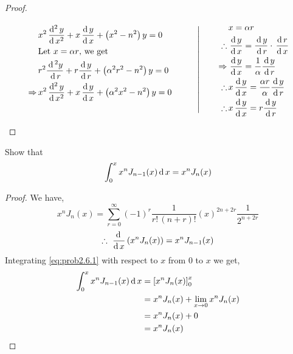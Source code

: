 \documentclass[../main-sheet.tex]{subfiles}
\begin{document}
\begin{proof}
\begin{note}
        \[
            \left.
            \begin{aligned}
                &  x^2\,\frac{\mathrm{d}^{2}\, y}{\mathrm{d}\, x^{2}}+x\,\frac{\mathrm{d}\,y}{\mathrm{d}\,x}+\left( x^2-n^2 \right)y=0\\
                &\text{Let $ x=\alpha r $, we get}\\
                &  r^2\frac{\,\mathrm{d}\,^2 y}{\,\mathrm{d}\, r}+r\frac{\,\mathrm{d}\, y}{\,\mathrm{d}\, r}+\left( \alpha^2 r^2-n^2 \right)y=0\\
                \Rightarrow\,& x^2\,\frac{\mathrm{d}^{2}\, y}{\mathrm{d}\, x^{2}}+x\,\frac{\mathrm{d}\,y}{\mathrm{d}\,x}+\left( \alpha^2 x^2-n^2 \right)y=0
                &\\
                &\\
            \end{aligned}
            \qquad\right\vert\qquad
            \begin{aligned}
                & x=\alpha r\\
                \therefore\, & \,\frac{\mathrm{d}\,y}{\mathrm{d}\,x}=\frac{\,\mathrm{d}\, y}{\,\mathrm{d}\, r}\cdot\,\frac{\mathrm{d}\,r}{\mathrm{d}\,x}\\
                \Rightarrow\, & \,\frac{\mathrm{d}\,y}{\mathrm{d}\,x}=\frac{1}{\alpha}\frac{\,\mathrm{d}\, y}{\,\mathrm{d}\, r}\\
                \therefore\, & x\,\frac{\mathrm{d}\,y}{\mathrm{d}\,x}=\frac{\alpha r}{\alpha}\frac{\,\mathrm{d}\, y}{\,\mathrm{d}\, r}\\
                \therefore\, & x\,\frac{\mathrm{d}\,y}{\mathrm{d}\,x}=r\frac{\,\mathrm{d}\, y}{\,\mathrm{d}\, r}
            \end{aligned}
        \]
    \end{note}
\end{proof}
\begin{prob}
    Show that 
    \[
        \int_0^x x^nJ_{n-1}(x)\,\mathrm{d}\, x=x^nJ_n(x)
    \]
\end{prob}
\begin{proof}
    We have,
    \[
        x^nJ_n(x)=\sum_{r=0}^\infty (-1)^r\frac{1}{r!\, (n+r)!}(x)^{2n+2r}\frac{1}{2^{n+2r}}
    \]
    \begin{equation}
        \therefore\, \,\frac{\mathrm{d}\,}{\mathrm{d}\,x}\left( x^n J_n(x) \right)=x^n J_{n-1}(x)\label{eq:prob2.6.1}
    \end{equation}
    Integrating \eqref{eq:prob2.6.1} with respect to $ x $ from $ 0 $ to $ x $ we get,
    \begin{align*}
        \int_0^x x^nJ_{n-1}(x)\,\mathrm{d}\, x &= \left[x^n J_{n}(x)\right]_{0}^x\\
        &=x^n J_n(x)+\lim\limits_{x\rightarrow 0}x^nJ_n(x)\\
        &=x^n J_n(x)+0\\
        &=x^n J_n(x)
    \end{align*}
\end{proof}
\end{document}
